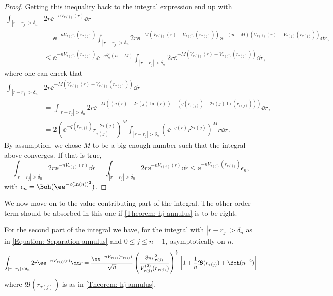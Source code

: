 \begin{proof}
	Getting this inequality back to the integral expression end up with
	\begin{align}
		\int_{|r - r_j| > \delta_n} & 2r \ee^{-n V_{\tau(j)}(r)} \dd r \\
		& =  \ee^{-n V_{\tau(j)}(r_{\tau(j)})} \int_{|r - r_j| > \delta_n} 2r \ee^{-M \left( V_{\tau(j)}(r) - V_{\tau(j)}(r_{\tau(j)}) \right)}  \ee^{-(n-M) \left( V_{\tau(j)}(r) - V_{\tau(j)}(r_{\tau(j)}) \right)} \dd r, \\
		& \leq \ee^{-n V_{\tau(j)}(r_{\tau(j)})}  \ee^{- c \delta_n^2 (n - M)} \int_{|r - r_j| > \delta_n} 2r \ee^{-M \left( V_{\tau(j)}(r) - V_{\tau(j)}(r_{\tau(j)}) \right)} \dd r,
	\end{align}
	where one can check that
	\begin{align}
		\int_{|r - r_j| > \delta_n}  & 2r \ee^{-M \left( V_{\tau(j)}(r) - V_{\tau(j)}(r_{\tau(j)}) \right)} \dd r \\ 
		& = \int_{|r - r_j| > \delta_n} 2r \ee^{-M \left( (q(r) - 2 \tau(j) \ln(r)) - (q(r_{\tau(j)}) - 2 \tau(j) \ln(r_{\tau(j)})) \right)} \dd r,  \\
		& = 2 \left( \ee^{-q(r_{\tau(j)})} r_{\tau(j)}^{-2 \tau(j)} \right)^M \int_{|r - r_j| > \delta_n} \left( \ee^{-q(r)} r^{2 \tau(j)} \right)^M r \dd r.
	\end{align}
	By assumption, we chose $M$ to be a big enough number such that the integral above converges. If that is true, 
	\begin{equation}
		\int_{|r - r_j| > \delta_n} 2r \ee^{-n V_{\tau(j)}(r)} \dd r = \int_{|r - r_j| > \delta_n} 2r \ee^{-n V_{\tau(j)}(r)} \dd r \leq \ee^{-n V_{\tau(j)}(r_{\tau(j)})} \epsilon_n,
	\end{equation}
	with $\epsilon_n = \Boh(\ee^{-c(\ln(n))^2})$.  
\end{proof}
	
We now move on to the value-contributing part of the integral. The other order term should be absorbed in this one if \autoref{Theorem: hj annulus} is to be right.
	
\begin{lema} 	\label{Lema: value annulus}
		For the second part of the integral we have, for the integral  with $|r - r_j| > \delta_n$ as in \eqref{Equation: Separation annulus} and $0 \leq j \leq n-1$, asymptotically on $n$,
		\begin{equation}
			\int_{|r - r_j| < \delta_n} 2r \ee^{-n V_{\tau(j)}(r)} \dd r  = \frac{\ee^{-n V_{\tau(j)}(r_{\tau(j)})}}{\sqrt{n}} \left( \frac{8\pi r_{\tau(j)}^2}{V^{(2)}_{\tau(j)}(r_{\tau(j)})} \right)^{\frac{1}{2}} \left[ 1 + \frac{1}{n} \mathfrak{B}(r_{\tau(j)}) + \Boh(n^{-2}) \right]
			\label{Equation: main part annulus}
		\end{equation}
		where $\mathfrak{B}(r_{\tau(j)})$ is as in \autoref{Theorem: hj annulus}.
\end{lema}	

